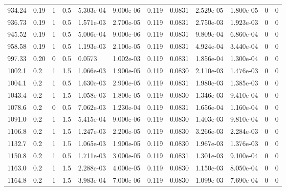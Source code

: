 \documentclass[preview]{standalone}
\begin{document}
{{\begin{tabular}{L{1.2cm}C{1.2cm} C{0.3cm}C{0.5cm} C{1.4cm}C{1.4cm} C{1.4cm}C{1.4cm} C{1.6cm}C{1.6cm} C{1.6cm}C{1.6cm}}
  934.24  &  0.19  & 1     & 0.5 &  5.303e-04  & 9.000e-06  &  0.119&   0.0831& 2.529e-05 & 1.800e-05   &  0 & 0  \\ 
  936.73  &  0.19  & 1     & 0.5 &  1.571e-03  & 2.700e-05  &  0.119&   0.0831& 2.750e-03 & 1.923e-03   &  0 & 0  \\ 
  945.52  &  0.19  & 1     & 0.5 &  5.006e-04  & 9.000e-06  &  0.119&   0.0831& 9.809e-04 & 6.860e-04   &  0 & 0  \\ 
  958.58  &  0.19  & 1     & 0.5 &  1.193e-03  & 2.100e-05  &  0.119&   0.0831& 4.924e-04 & 3.440e-04   &  0 & 0  \\ 
  997.33  &  0.20  & 0     & 0.5 &  0.0573  & 1.002e-03  &  0.119&   0.0831& 1.856e-04 & 1.300e-04   &  0 & 0  \\ 
  1002.1  &   0.2  & 1     & 1.5 &  1.066e-03  & 1.900e-05  &  0.119&   0.0830& 2.110e-03 & 1.476e-03   &  0 & 0  \\ 
  1004.1  &   0.2  & 1     & 0.5 &  1.630e-03  & 2.900e-05  &  0.119&   0.0831& 1.980e-03 & 1.385e-03   &  0 & 0  \\ 
  1043.4  &   0.2  & 1     & 1.5 &  1.058e-03  & 1.800e-05  &  0.119&   0.0830& 1.346e-03 & 9.410e-04   &  0 & 0  \\ 
  1078.6  &   0.2  & 0     & 0.5 &  7.062e-03  & 1.230e-04  &  0.119&   0.0831& 1.656e-04 & 1.160e-04   &  0 & 0  \\ 
  1091.0  &   0.2  & 1     & 1.5 &  5.415e-04  & 9.000e-06  &  0.119&   0.0830& 1.403e-03 & 9.810e-04   &  0 & 0  \\ 
  1106.8  &   0.2  & 1     & 1.5 &  1.247e-03  & 2.200e-05  &  0.119&   0.0830& 3.266e-03 & 2.284e-03   &  0 & 0  \\ 
  1132.7  &   0.2  & 1     & 1.5 &  1.065e-03  & 1.900e-05  &  0.119&   0.0830& 1.967e-03 & 1.376e-03   &  0 & 0  \\ 
  1150.8  &   0.2  & 1     & 0.5 &  1.711e-03  & 3.000e-05  &  0.119&   0.0831& 1.301e-03 & 9.100e-04   &  0 & 0  \\ 
  1163.0  &   0.2  & 1     & 1.5 &  2.288e-03  & 4.000e-05  &  0.119&   0.0830& 1.150e-03 & 8.050e-04   &  0 & 0  \\ 
  1164.8  &   0.2  & 1     & 1.5 &  3.983e-04  & 7.000e-06  &  0.119&   0.0830& 1.099e-03 & 7.690e-04   &  0 & 0  \\ 
\hline 
\end{tabular} 

}}
\end{document}
